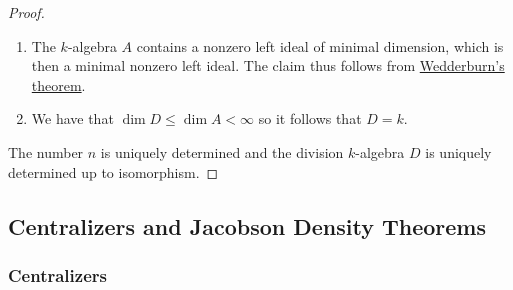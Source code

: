 \begin{proof}
  \leavevmode
  \begin{enumerate}
    \item
      The $k$-algebra $A$ contains a nonzero left ideal of minimal dimension, which is then a minimal nonzero left ideal.
      The claim thus follows from \hyperref[theorem: wedderburns theorem]{Wedderburn’s theorem}.
    \item
      We have that $\dim D \leq \dim A < \infty$ so it follows that $D = k$.
    \qedhere
  \end{enumerate}
  The number $n$ is uniquely determined and the division $k$-algebra $D$ is uniquely determined up to isomorphism.
\end{proof}





\subsection*{Centralizers and Jacobson Density Theorems}



\subsubsection{Centralizers}

